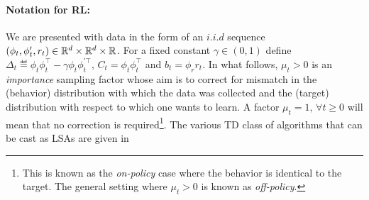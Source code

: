\paragraph{Notation for RL:} We are presented with data in the form of an $i.i.d$ sequence $(\phi_t,\phi'_t,r_t)\in \mathbb{R}^d\times\mathbb{R}^d\times \mathbb{R}$. For a fixed constant $\gamma \in (0,1)$ define  $\Delta_t\eqdef \phi_t\phi_t^\top-\gamma \phi_t\phi_t^{'\top}$, $C_t=\phi_t\phi_t^\top$ and $b_t=\phi_r r_t$. In what follows, $\mu_t>0$ is an \emph{importance} sampling factor whose aim is to correct for mismatch in the (behavior) distribution with which the data was collected and the (target) distribution with respect to which one wants to learn. A factor $\mu_t=1,\,\forall t\geq 0$ will mean that no correction is required\footnote{This is known as the \emph{on-policy} case where the behavior is identical to the target. The general setting where $\mu_t>0$ is known as \emph{off-policy}.}. The various TD class of algorithms that can be cast as LSAs are given in 
\FloatBarrier
\begin{table}[h]
\label{tb:tdalgo}
\caption{Some popular TD algorithms with rates known in literature \cite{korda-prashanth,gtd2,gtdmp}. }
\end{table}
